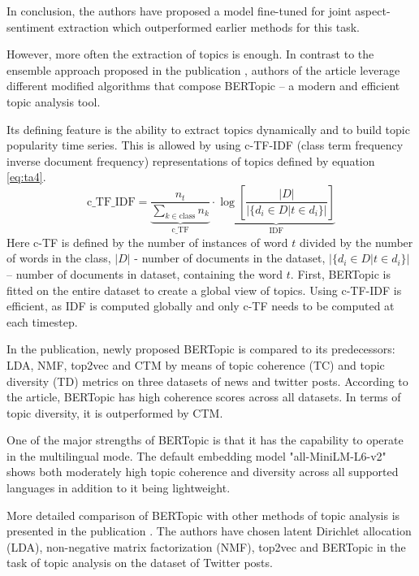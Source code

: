 \documentclass[3p,times,procedia]{elsarticle}
\begin{document}
In conclusion, the authors have proposed a model fine-tuned for joint aspect-sentiment extraction which outperformed earlier methods for this task.

However, more often the extraction of topics is enough. In contrast to the ensemble approach proposed in the publication \cite{onan2019two}, authors of the article \cite{grootendorst2022bertopic} leverage different modified algorithms that compose BERTopic -- a modern and efficient topic analysis tool.

Its defining feature is the ability to extract topics dynamically and to build topic popularity time series. This is allowed by using c-TF-IDF (class term frequency inverse document frequency) representations of topics defined by equation \ref{eq:ta4}.
\begin{equation} \label{eq:ta4}
\mathrm{c\_TF\_IDF} = \underbrace{\frac{n_t}{\sum\limits_{k \in \mathrm{class}} n_k}}_{\mathrm{c\_TF}} \cdot \underbrace{\log \left[ \frac{|D|}{|\{ d_i \in D | t \in d_i \}|} \right]}_{\mathrm{IDF}}
\end{equation}
Here c-TF is defined by the number of instances of word $t$ divided by the number of words in the class, $|D|$ - number of documents in the dataset, $|\{ d_i \in D | t \in d_i \}|$ -- number of documents in dataset, containing the word $t$. First, BERTopic is fitted on the entire dataset to create a global view of topics. Using c-TF-IDF is efficient, as IDF is computed globally and only c-TF needs to be computed at each timestep.

In the publication, newly proposed BERTopic is compared to its predecessors: LDA, NMF, top2vec and CTM by means of topic coherence (TC) and topic diversity (TD) metrics on three datasets of news and twitter posts. According to the article, BERTopic has high coherence scores across all datasets. In terms of topic diversity, it is outperformed by CTM.

One of the major strengths of BERTopic is that it has the capability to operate in the multilingual mode. The default embedding model "all-MiniLM-L6-v2" shows both moderately high topic coherence and diversity across all supported languages in addition to it being lightweight.

More detailed comparison of BERTopic with other methods of topic analysis is presented in the publication \cite{egger2022topic}. The authors have chosen latent Dirichlet allocation (LDA), non-negative matrix factorization (NMF), top2vec and BERTopic in the task of topic analysis on the dataset of Twitter posts.
\end{document}
